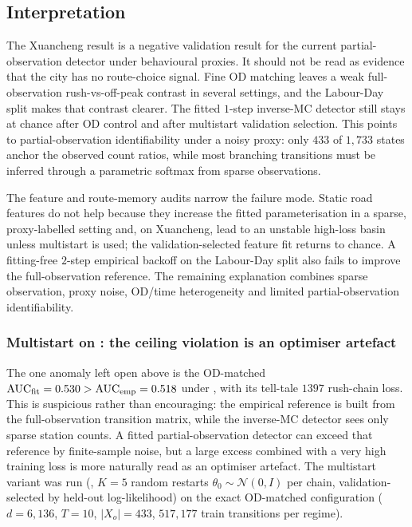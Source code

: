 \subsection{Interpretation}\label{sec:phase5-interpretation}

The Xuancheng result is a negative validation result for the current
partial-observation detector under behavioural proxies. It should not be
read as evidence that the city has no route-choice signal. Fine OD
matching leaves a weak full-observation rush-vs-off-peak contrast in
several settings, and the Labour-Day split makes that contrast clearer.
The fitted $1$-step
inverse-MC detector still stays at chance after OD control and after
multistart validation selection. This points to partial-observation
identifiability under a noisy proxy: only $433$ of $1{,}733$ states anchor
the observed count ratios, while most branching transitions must be
inferred through a parametric softmax from sparse observations.

The feature and route-memory audits narrow the failure mode. Static road
features do not help because they increase the fitted parameterisation in
a sparse, proxy-labelled setting and, on Xuancheng, lead to an unstable
high-loss basin unless multistart is used; the validation-selected
feature fit returns to chance. A fitting-free $2$-step empirical backoff
on the Labour-Day split also fails to improve the full-observation
reference. The remaining explanation combines sparse observation, proxy
noise, OD/time heterogeneity and limited partial-observation
identifiability.

\subsubsection{Multistart on : the ceiling violation is
an optimiser artefact}\label{sec:phase5-multistart}

The one anomaly left open above is the OD-matched
$\mathrm{AUC}_{\mathrm{fit}} = 0.530 > \mathrm{AUC}_{\mathrm{emp}} = 0.518$ under
, with its tell-tale $1397$ rush-chain loss. This is
suspicious rather than encouraging: the empirical reference is built from
the full-observation transition matrix, while the inverse-MC detector sees
only sparse station counts. A fitted partial-observation detector can
exceed that reference by finite-sample noise, but a large excess combined
with a very high training loss is more naturally read as an optimiser
artefact. The multistart variant was run
(,
$K=5$ random restarts $\theta_0 \sim \mathcal{N}(0,I)$ per chain,
validation-selected by held-out log-likelihood) on the exact OD-matched
 configuration ($d=6{,}136$, $T=10$,
$|X_o| = 433$, $517{,}177$ train transitions per regime).

